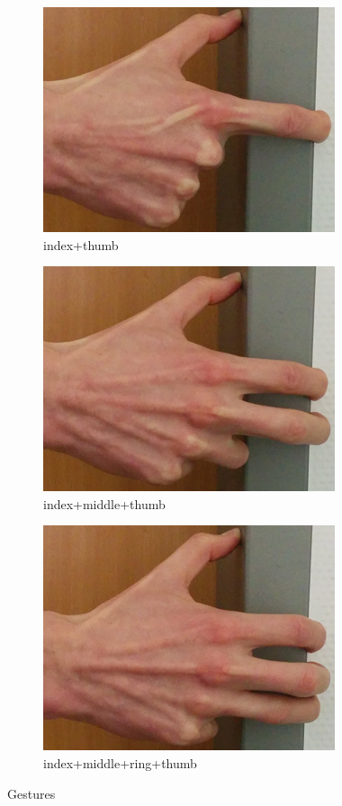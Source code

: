 \documentclass[journal]{IEEEtran}
\begin{document}
\begin{figure}[t!]
    
        \begin{subfigure}{0.25\textwidth}
        \centering
        \includegraphics[width=.8\linewidth]{img/index+thumb}
        \caption{index+thumb}
    \end{subfigure}%
    \begin{subfigure}{0.25\textwidth}
        \centering
        \includegraphics[width=.8\linewidth]{img/index+middle+thumb}
        \caption{index+middle+thumb}
    \end{subfigure}%
        \begin{subfigure}{0.25\textwidth}
        \centering
        \includegraphics[width=.8\linewidth]{img/index+middle+ring+thumb}
        \caption{index+middle+ring+thumb}
    \end{subfigure}%
    \caption{Gestures} \label{gestures}
\end{figure}
\end{document}
